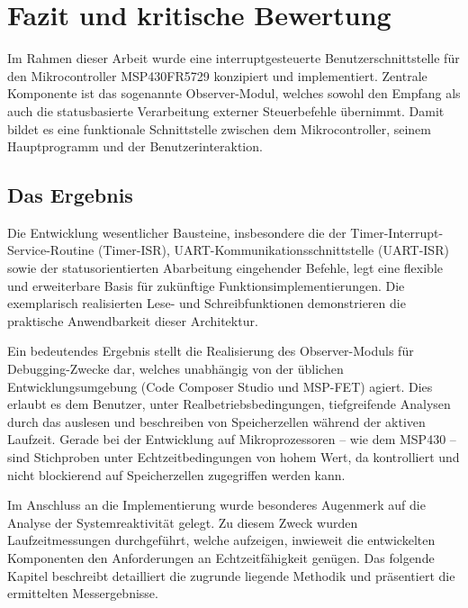 

\chapter{Fazit und kritische Bewertung}
\label{cha:Fazit}

Im Rahmen dieser Arbeit wurde eine interruptgesteuerte Benutzerschnittstelle f\"ur den Mikrocontroller MSP430FR5729 konzipiert und implementiert. Zentrale Komponente ist das sogenannte Observer-Modul, welches sowohl den Empfang als auch die statusbasierte Verarbeitung externer Steuerbefehle \"ubernimmt. Damit bildet es eine funktionale Schnittstelle zwischen dem Mikrocontroller, seinem Hauptprogramm und der Benutzerinteraktion.


\section{Das Ergebnis}
\label{sec:Ergebnis}

Die Entwicklung wesentlicher Bausteine, insbesondere die der Timer-Interrupt-Service-Routine (Timer-ISR), UART-Kommunikationsschnittstelle (UART-ISR) sowie der statusorientierten Abarbeitung eingehender Befehle, legt eine flexible und erweiterbare Basis f\"ur zuk\"unftige Funktionsimplementierungen. Die exemplarisch realisierten Lese- und Schreibfunktionen demonstrieren die praktische Anwendbarkeit dieser Architektur.

Ein bedeutendes Ergebnis stellt die Realisierung des Observer-Moduls f\"ur Debugging-Zwecke dar, welches unabh\"angig von der \"ublichen Entwicklungsumgebung (Code Composer Studio und MSP-FET) agiert. Dies erlaubt es dem Benutzer, unter Realbetriebsbedingungen, tiefgreifende Analysen durch das auslesen und beschreiben von Speicherzellen w\"ahrend der aktiven Laufzeit. Gerade bei der Entwicklung auf Mikroprozessoren -- wie dem MSP430 -- sind Stichproben unter Echtzeitbedingungen von hohem Wert, da kontrolliert und nicht blockierend auf Speicherzellen zugegriffen werden kann.

Im Anschluss an die Implementierung wurde besonderes Augenmerk auf die Analyse der Systemreaktivit\"at gelegt. Zu diesem Zweck wurden Laufzeitmessungen durchgef\"uhrt, welche aufzeigen, inwieweit die entwickelten Komponenten den Anforderungen an Echtzeitf\"ahigkeit gen\"ugen. Das folgende Kapitel beschreibt detailliert die zugrunde liegende Methodik und pr\"asentiert die ermittelten Messergebnisse.\AI


